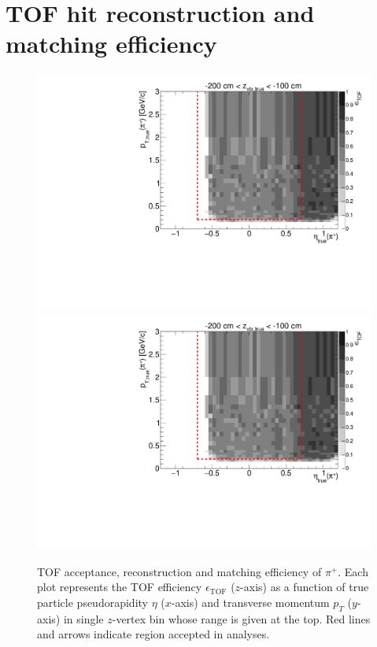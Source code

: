 
\chapter{TOF hit reconstruction and matching efficiency}\label{appendix:tofEff}


\begin{figure}[hb]
\caption[TOF acceptance, reconstruction and matching efficiency of $\pi^{+}$.]{TOF acceptance, reconstruction and matching efficiency of $\pi^{+}$. Each plot represents the TOF efficiency $\epsilon_{\text{TOF}}$ ($z$-axis) as a function of true particle pseudorapidity $\eta$ ($x$-axis) and transverse momentum $p_{T}$ ($y$-axis) in single $z$-vertex bin whose range is given at the top. Red lines and arrows indicate region accepted in analyses.}\label{fig:eff_pion_plus}
\centering
\parbox{0.495\textwidth}{
  \centering
  \includegraphics[width=\linewidth,page=3]{graphics/eff/Eff2D_TOF_pion_Plus.pdf}\\
  \includegraphics[width=\linewidth,page=5]{graphics/eff/Eff2D_TOF_pion_Plus.pdf}\\
}
\end{figure}
